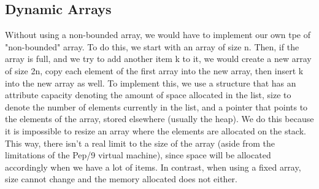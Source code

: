 \documentclass[12pt]{article}
\begin{document}
\subsection*{Dynamic Arrays}
Without using a non-bounded array, we would have to implement our own tpe of "non-bounded" array. To do this, we start with an array of size n. Then, if the array is full, and we try to add another item k to it, we would create a new array of size 2n, copy each element of the first array into the new array, then insert k into the new array as well. To implement this, we use a structure that has an attribute capacity denoting the amount of space allocated in the list, size to denote the number of elements currently in the list, and a pointer that points to the elements of the array, stored elsewhere (usually the heap). We do this because it is impossible to resize an array where the elements are allocated on the stack. This way, there isn't a real limit to the size of the array (aside from the limitations of the Pep/9 virtual machine), since space will be allocated accordingly when we have a lot of items. In contrast, when using a fixed array, size cannot change and the memory allocated does not either.
\end{document}
